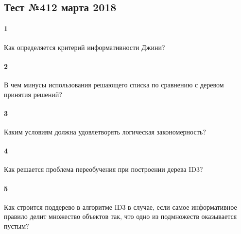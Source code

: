 \documentclass[a4paper,12pt]{article}
\begin{document}
  \subsection*{Тест №4\hfill{12 марта 2018}}

  \paragraph{1} Как определяется критерий информативности Джини?
  
  \makebox[\linewidth]{\hrulefill}
  \makebox[\linewidth]{\hrulefill}
  
  \paragraph{2} В чем минусы использования решающего списка по сравнению с
  деревом принятия решений?

  \makebox[\linewidth]{\hrulefill}
  \makebox[\linewidth]{\hrulefill}
  \makebox[\linewidth]{\hrulefill}
  \makebox[\linewidth]{\hrulefill}

  \paragraph{3} Каким условиям должна удовлетворять логическая закономерность?

  \makebox[\linewidth]{\hrulefill}
  \makebox[\linewidth]{\hrulefill}
  \makebox[\linewidth]{\hrulefill}
  \makebox[\linewidth]{\hrulefill}

  \paragraph{4} Как решается проблема переобучения при построении дерева ID3?

  \makebox[\linewidth]{\hrulefill}
  \makebox[\linewidth]{\hrulefill}
  \makebox[\linewidth]{\hrulefill}
  \makebox[\linewidth]{\hrulefill}

  \paragraph{5} Как строится поддерево в алгоритме ID3 в случае, если самое
  информативное правило делит множество объектов так, что одно из подмножеств
  оказывается пустым?

  \makebox[\linewidth]{\hrulefill}
  \makebox[\linewidth]{\hrulefill}
  \makebox[\linewidth]{\hrulefill}
  \makebox[\linewidth]{\hrulefill}
  
\end{document}
